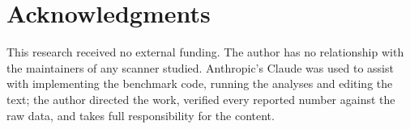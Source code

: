 \documentclass[10pt,journal,compsoc]{IEEEtran}
\begin{document}
\section*{Acknowledgments}
This research received no external funding. The author has no relationship with the maintainers of any scanner studied. Anthropic's Claude was used to assist with implementing the benchmark code, running the analyses and editing the text; the author directed the work, verified every reported number against the raw data, and takes full responsibility for the content.



\end{document}
